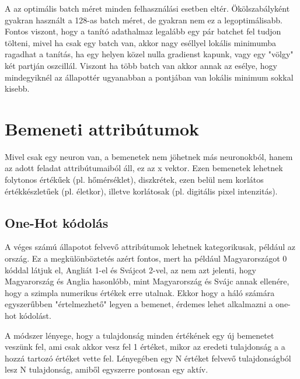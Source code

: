 A az optimális batch méret minden felhasználási esetben eltér. Ökölszabályként gyakran használt a 128-as batch méret, de gyakran nem ez a legoptimálisabb. Fontos viszont, hogy a tanító adathalmaz legalább egy pár batchet fel tudjon tölteni, mivel ha csak egy batch van, akkor nagy eséllyel lokális minimumba ragadhat a tanítás, ha egy helyen közel nulla gradienst kapunk, vagy egy "völgy" két partján oszcillál. Viszont ha több batch van akkor annak az esélye, hogy mindegyiknél az állapottér ugyanabban a pontjában van lokális minimum sokkal kisebb.

\section{Bemeneti attribútumok}
Mivel csak egy neuron van, a bemenetek nem jöhetnek más neuronokból, hanem az adott feladat attribútumaiból áll, ez az x vektor. Ezen bemenetek lehetnek folytonos értékűek (pl. hőmérséklet), diszkrétek, ezen belül nem korlátos értékkészletűek (pl. életkor), illetve korlátosak (pl. digitális pixel intenzitás).
\subsection{One-Hot kódolás}
A véges számú állapotot felvevő attribútumok lehetnek kategorikusak, például az ország. Ez a megkülönböztetés azért fontos, mert ha például Magyarországot 0 kóddal látjuk el, Angliát 1-el és Svájcot 2-vel, az nem azt jelenti, hogy Magyarország és Anglia hasonlóbb, mint Magyarország és Svájc annak ellenére, hogy a szimpla numerikus értékek erre utalnak. Ekkor hogy a háló számára egyszerűbben "értelmezhető" legyen a bemenet, érdemes lehet alkalmazni a one-hot kódolást.

A módszer lényege, hogy a tulajdonság minden értékének egy új bemenetet veszünk fel, ami csak akkor vesz fel 1 értéket, mikor az eredeti tulajdonság a a hozzá tartozó értéket vette fel. Lényegében egy N értéket felvevő tulajdonságból lesz N tulajdonság, amiből egyszerre pontosan egy aktív.

